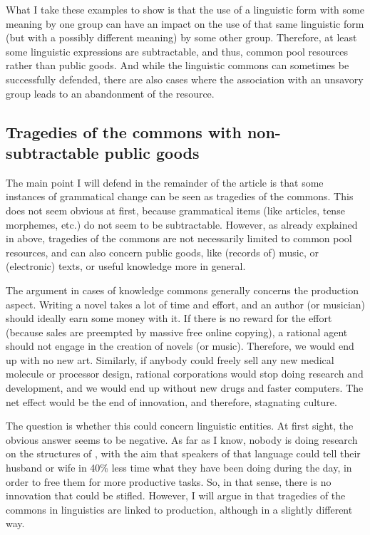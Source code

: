 \documentclass[output=paper,hidelinks]{langscibook}
\begin{document}
What I take these examples to show is that the use of a linguistic form with some meaning by one group can have an impact on the use of that same linguistic form (but with a possibly different meaning) by some other group. Therefore, at least some linguistic expressions are subtractable, and thus, common pool resources rather than public goods. And while the linguistic commons can sometimes be successfully defended, there are also cases where the association with an unsavory group leads to an abandonment of the resource.

\subsection{Tragedies of the commons with non-subtractable public goods}
\label{sec:trag-comm-with}

The main point I will defend in the remainder of the article is that some instances of grammatical change can be seen as tragedies of the commons. This does not seem obvious at first, because grammatical items (like articles, tense morphemes, etc.) do not seem to be subtractable. However, as already explained in  above, tragedies of the commons are not necessarily limited to common pool resources, and can also concern public goods, like (records of) music, or (electronic) texts, or useful knowledge more in general.

The argument in cases of knowledge commons generally concerns the production aspect. Writing a novel takes a lot of time and effort, and an author (or musician) should ideally earn some money with it. If there is no reward for the effort (because sales are preempted by massive free online copying), a rational agent should not engage in the creation of novels (or music). Therefore, we would end up with no new art. Similarly, if anybody could freely sell any new medical molecule or processor design, rational corporations would stop doing research and development, and we would end up without new drugs and faster computers. The net effect would be the end of innovation, and therefore, stagnating culture.

The question is whether this could concern linguistic entities. At first sight, the obvious answer seems to be negative. As far as I know, nobody is doing research on the structures of , with the aim that speakers of that language could tell their husband or wife in 40\% less time what they have been doing during the day, in order to free them for more productive tasks. So, in that sense, there is no innovation that could be stifled. However, I will argue in  that tragedies of the commons in linguistics are linked to production, although in a slightly different way.
\end{document}
